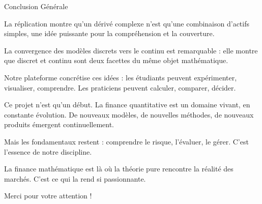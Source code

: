 \documentclass[aspectratio=169, 10pt]{beamer}
\begin{document}
\begin{frame}{Conclusion Générale}
{        La réplication montre qu'un dérivé complexe n'est qu'une combinaison
        d'actifs simples, une idée puissante pour la compréhension et la couverture.
        
        La convergence des modèles discrets vers le continu est remarquable :
        elle montre que discret et continu sont deux facettes du même objet mathématique.
        
        Notre plateforme concrétise ces idées : les étudiants peuvent
        expérimenter, visualiser, comprendre. Les praticiens peuvent calculer,
        comparer, décider.
        
        Ce projet n'est qu'un début. La finance quantitative est un domaine
        vivant, en constante évolution. De nouveaux modèles, de nouvelles méthodes,
        de nouveaux produits émergent continuellement.
        
        Mais les fondamentaux restent : comprendre le risque, l'évaluer,
        le gérer. C'est l'essence de notre discipline.
        
        La finance mathématique est là où la théorie pure rencontre
        la réalité des marchés. C'est ce qui la rend si passionnante.
    }
\end{frame}

\begin{frame}
  \vfill
  \centering
  {\calligra \fontsize{30pt}{38pt}\selectfont Merci pour votre attention !}
  \vfill
\end{frame}
\end{document}
